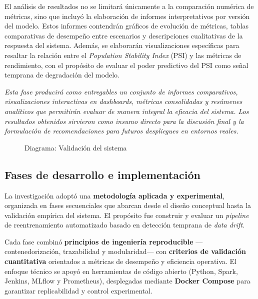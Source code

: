\begin{enumerate}
    El análisis de resultados no se limitará únicamente a la comparación numérica de métricas, sino que incluyó la elaboración de informes interpretativos por versión del modelo. Estos informes contendrán gráficos de evolución de métricas, tablas comparativas de desempeño entre escenarios y descripciones cualitativas de la respuesta del sistema. Además, se elaborarán visualizaciones específicas para resaltar la relación entre el \textit{Population Stability Index} (PSI) y las métricas de rendimiento, con el propósito de evaluar el poder predictivo del PSI como señal temprana de degradación del modelo.
    
    \textit{Esta fase producirá como entregables un conjunto de informes comparativos, visualizaciones interactivas en dashboards, métricas consolidadas y resúmenes analíticos que permitirán evaluar de manera integral la eficacia del sistema. Los resultados obtenidos sirvieron como insumo directo para la discusión final y la formulación de recomendaciones para futuros despliegues en entornos reales.}


    \begin{figure}[H]
    \centering
    \caption{Diagrama: Validación del sistema}
    \end{figure}
\end{enumerate}

\fi

\subsection{Fases de desarrollo e implementación}

La investigación adoptó una \textbf{metodología aplicada y experimental}, organizada en fases secuenciales que abarcan desde el diseño conceptual hasta la validación empírica del sistema. El propósito fue construir y evaluar un \textit{pipeline} de reentrenamiento automatizado basado en detección temprana de \textit{data drift}.

Cada fase combinó \textbf{principios de ingeniería reproducible} —contenedorización, trazabilidad y modularidad— con \textbf{criterios de validación cuantitativa} orientados a métricas de desempeño y eficiencia operativa. El enfoque técnico se apoyó en herramientas de código abierto (Python, Spark, Jenkins, MLflow y Prometheus), desplegadas mediante \textbf{Docker Compose} para garantizar replicabilidad y control experimental.

